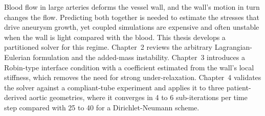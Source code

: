 Blood flow in large arteries deforms the vessel wall, and the wall's motion in turn changes the
flow. Predicting both together is needed to estimate the stresses that drive aneurysm growth,
yet coupled simulations are expensive and often unstable when the wall is light compared with
the blood. This thesis develops a partitioned solver for this regime. Chapter~2 reviews the
arbitrary Lagrangian-Eulerian formulation and the added-mass instability. Chapter~3 introduces
a Robin-type interface condition with a coefficient estimated from the wall's local stiffness,
which removes the need for strong under-relaxation. Chapter~4 validates the solver against a
compliant-tube experiment and applies it to three patient-derived aortic geometries, where it
converges in 4 to 6 sub-iterations per time step compared with 25 to 40 for a Dirichlet-Neumann
scheme.
